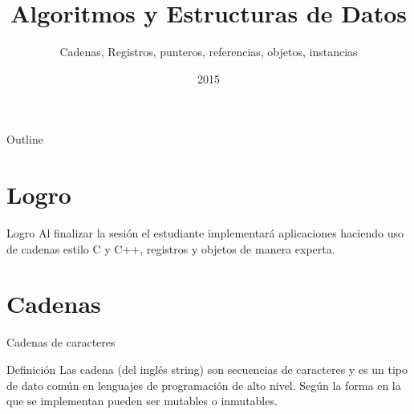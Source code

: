\documentclass[aspectratio=169]{beamer}
\title{Algoritmos y Estructuras de Datos}
\subtitle{Cadenas, Registros, punteros, referencias, objetos, instancias}
\date{2015}
\institute{\href{http://www.upc.edu.pe}{Universidad Peruana de Ciencias Aplicadas}}
\begin{document}
\maketitle

\begin{frame}{Outline}
\tableofcontents
\end{frame}

\section{Logro}
\begin{frame}{Logro}
Al finalizar la sesión el estudiante implementará aplicaciones haciendo uso
de cadenas estilo C y C++, registros y objetos de manera experta.
\end{frame}

\section{Cadenas}
\begin{frame}{Cadenas de caracteres}
\begin{block}{Definición}
Las cadena (del inglés string) son secuencias de caracteres y es un tipo de dato común en lenguajes de programación de alto nivel. Según la forma en la que se implementan pueden ser mutables o inmutables.
\end{block}
\end{frame}
\end{document}
